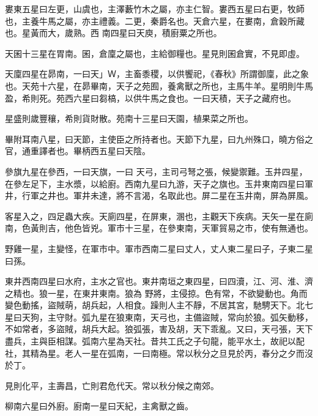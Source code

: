 \begin{pinyinscope}
 婁東五星曰左更，山虞也，主澤藪竹木之屬，亦主仁智。婁西五星曰右更，牧師也，主養牛馬之屬，亦主禮義。二更，秦爵名也。天倉六星，在婁南，倉穀所藏也。星黃而大，歲熟。西
 南四星曰天庾，積廚粟之所也。



 天囷十三星在胃南。囷，倉廩之屬也，主給御糧也。星見則囷倉實，不見即虛。



 天廩四星在昴南，一曰天」Ｗ，主畜黍稷，以供饗祀，《春秋》所謂御廩，此之象也。天苑十六星，在昴畢南，天子之苑囿，養禽獸之所也，主馬牛羊。星明則牛馬盈，希則死。苑西六星曰芻槁，以供牛馬之食也。一曰天積，天子之藏府也。



 星盛則歲豐穰，希則貨財散。苑南十三星曰天園，植果菜之所也。



 畢附耳南八星，曰天節，主使臣之所持者也。天節下九星，曰九州殊口，曉方俗之官，通重譯者也。畢柄西五星曰天陰。



 參旗九星在參西，一曰天旗，一曰
 天弓，主司弓弩之張，候變禦難。玉井四星，在參左足下，主水漿，以給廚。西南九星曰九游，天子之旗也。玉井東南四星曰軍井，行軍之井也。軍井未達，將不言渴，名取此也。屏二星在玉井南，屏為屏風。



 客星入之，四足蟲大疾。天廁四星，在屏東，溷也，主觀天下疾病。天矢一星在廁南，色黃則吉，他色皆兇。軍市十三星，在參東南，天軍貿易之市，使有無通也。



 野雞一星，主變怪，在軍市中。軍市西南二星曰丈人，丈人東二星曰子，子東二星曰孫。



 東井西南四星曰水府，主水之官也。東井南垣之東四星，曰四瀆，江、河、淮、濟之精也。狼一星，在東井東南。狼為
 野將，主侵掠。色有常，不欲變動也。角而變色動搖，盜賊萌，胡兵起，人相食。躁則人主不靜，不居其宮，馳騁天下。北七星曰天狗，主守財。弧九星在狼東南，天弓也，主備盜賊，常向於狼。弧矢動移，不如常者，多盜賊，胡兵大起。狼弧張，害及胡，天下乖亂。又曰，天弓張，天下盡兵，主與臣相謀。弧南六星為天社。昔共工氏之子句龍，能平水土，故祀以配社，其精為星。老人一星在弧南，一曰南極。常以秋分之旦見於丙，春分之夕而沒於丁。



 見則化平，主壽昌，亡則君危代天。常以秋分候之南郊。



 柳南六星曰外廚。廚南一星曰天紀，主禽獸之齒。




\end{pinyinscope}
